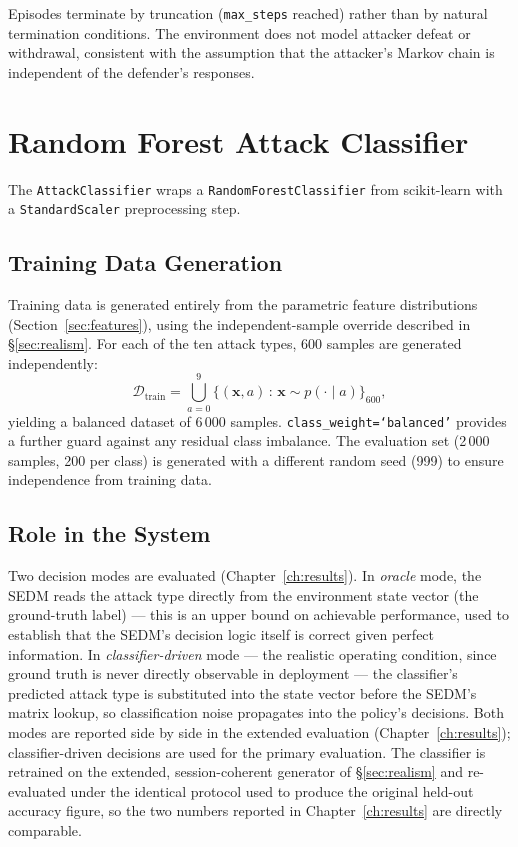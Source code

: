 Episodes terminate by truncation (\texttt{max\_steps} reached) rather than
by natural termination conditions.
The environment does not model attacker defeat or withdrawal, consistent with
the assumption that the attacker's Markov chain is independent of the
defender's responses.

\section{Random Forest Attack Classifier}
\label{sec:classifier}

The \texttt{AttackClassifier} wraps a \texttt{RandomForestClassifier} from
scikit-learn with a \texttt{StandardScaler} preprocessing step.

\subsection{Training Data Generation}

Training data is generated entirely from the parametric feature distributions
(Section~\ref{sec:features}), using the independent-sample override
described in \S\ref{sec:realism}.
For each of the ten attack types, 600 samples are generated independently:
%
\begin{equation}
  \mathcal{D}_{\text{train}} = \bigcup_{a=0}^{9}
  \bigl\{(\mathbf{x}, a) \,:\, \mathbf{x} \sim p(\cdot \mid a)\bigr\}_{600},
\end{equation}
%
yielding a balanced dataset of 6\,000 samples.
\texttt{class\_weight=`balanced'} provides a further guard against any
residual class imbalance.
The evaluation set (2\,000 samples, 200 per class) is generated with a
different random seed (999) to ensure independence from training data.

\subsection{Role in the System}

Two decision modes are evaluated (Chapter~\ref{ch:results}).
In \emph{oracle} mode, the SEDM reads the attack type directly from the
environment state vector (the ground-truth label) — this is an upper bound
on achievable performance, used to establish that the SEDM's decision logic
itself is correct given perfect information. In \emph{classifier-driven}
mode — the realistic operating condition, since ground truth is never
directly observable in deployment — the classifier's predicted attack type
is substituted into the state vector before the SEDM's matrix lookup, so
classification noise propagates into the policy's decisions. Both modes are
reported side by side in the extended evaluation (Chapter~\ref{ch:results});
classifier-driven decisions are used for the primary evaluation. The
classifier is retrained on the extended, session-coherent generator of
\S\ref{sec:realism} and re-evaluated under the identical protocol used to
produce the original held-out accuracy figure, so the two numbers reported
in Chapter~\ref{ch:results} are directly comparable.

